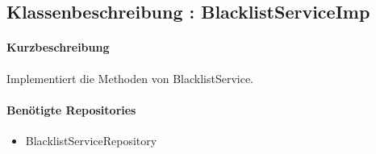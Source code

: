 \subsection{Klassenbeschreibung : BlacklistServiceImp}%
\paragraph*{Kurzbeschreibung}
Implementiert die Methoden von BlacklistService.
\paragraph*{Benötigte Repositories}
\begin{itemize}
    \item BlacklistServiceRepository
\end{itemize}